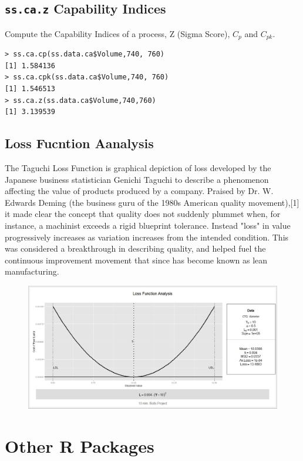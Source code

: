 \documentclass[MASTER-SPC.tex]{subfiles}
\begin{document}
\subsection{\texttt{ss.ca.z} Capability Indices}

Compute the Capability Indices of a process, Z (Sigma Score), $C_p$ and $C_{pk}$.
\begin{verbatim}
> ss.ca.cp(ss.data.ca$Volume,740, 760)
[1] 1.584136
> ss.ca.cpk(ss.data.ca$Volume,740, 760)
[1] 1.546513
> ss.ca.z(ss.data.ca$Volume,740,760)
[1] 3.139539
\end{verbatim}



\newpage
\newpage
\subsection{Loss Fucntion Aanalysis}
The Taguchi Loss Function is graphical depiction of loss developed by the Japanese business statistician Genichi Taguchi to describe a phenomenon affecting the value of products produced by a company. Praised by Dr. W. Edwards Deming (the business guru of the 1980s American quality movement),[1] it made clear the concept that quality does not suddenly plummet when, for instance, a machinist exceeds a rigid blueprint tolerance. Instead "loss" in value progressively increases as variation increases from the intended condition. This was considered a breakthrough in describing quality, and helped fuel the continuous improvement movement that since has become known as lean manufacturing.

\begin{figure}[h!]
\centering
\includegraphics[width=0.7\linewidth]{images/LossFunctionAnalysis}
\caption{}
\label{fig:LossFunctionAnalysis}
\end{figure}
\newpage
\section{Other R Packages}
\end{document}
